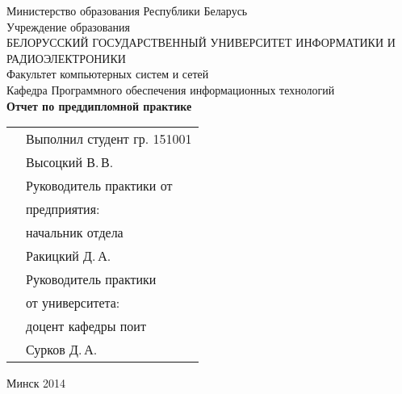 \begin{titlepage}
    
    \begin{center}
        Министерство образования Республики Беларусь \\[0.4cm] 

        Учреждение образования \\

        \MakeUppercase{БЕЛОРУССКИЙ ГОСУДАРСТВЕННЫЙ УНИВЕРСИТЕТ ИНФОРМАТИКИ И РАДИОЭЛЕКТРОНИКИ} \\[0.4cm]

        Факультет компьютерных систем и сетей \\[0.4cm]

        Кафедра Программного обеспечения информационных технологий \\[3.4cm] %

        {\large\bfseries{Отчет по преддипломной практике}} \\[2cm]

        \noindent
        \begin{tabular}{p{}p{}}
            & Выполнил студент гр. 151001 \\
            & Высоцкий В.\,В. \\[1cm]

            & Руководитель практики от \\
            & предприятия: \\
            & начальник отдела \\
            & Ракицкий Д.\,А. \\[1cm]

            & Руководитель практики \\
            & от университета: \\
            & доцент кафедры поит \\
            & Сурков Д.\,А. \\
        \end{tabular}

        \vfill

        {\normalsize Минск 2014}
    \end{center}

\end{titlepage}
